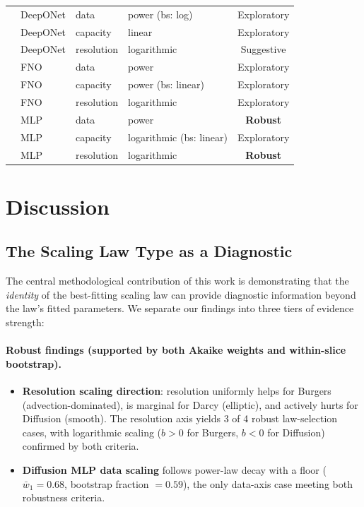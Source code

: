 \documentclass[11pt]{article}
\begin{document}
\begin{table}[h]
\begin{tabular}{@{}llllc@{}}
  & DeepONet & data       & power (bs: log) & Exploratory \\
  & DeepONet & capacity   & linear       & Exploratory \\
  & DeepONet & resolution & logarithmic & Suggestive \\
  & FNO      & data       & power       & Exploratory \\
  & FNO      & capacity   & power (bs: linear) & Exploratory \\
  & FNO      & resolution & logarithmic & Exploratory \\
  & MLP      & data       & power       & \textbf{Robust} \\
  & MLP      & capacity   & logarithmic (bs: linear) & Exploratory \\
  & MLP      & resolution & logarithmic & \textbf{Robust} \\
\bottomrule
\end{tabular}

\vspace{2pt}
\end{table}


\section{Discussion}
\label{sec:discussion}

\subsection{The Scaling Law Type as a Diagnostic}

The central methodological contribution of this work is demonstrating
that the \emph{identity} of the best-fitting scaling law can provide
diagnostic information beyond the law's fitted parameters.
We separate our findings into three tiers of evidence strength:

\paragraph{Robust findings (supported by both Akaike weights and
within-slice bootstrap).}
\begin{itemize}
  \item \textbf{Resolution scaling direction}: resolution uniformly
    helps for Burgers (advection-dominated), is marginal for Darcy
    (elliptic), and actively hurts for Diffusion (smooth).
    The resolution axis yields 3 of 4 robust law-selection cases,
    with logarithmic scaling ($b > 0$ for Burgers, $b < 0$ for
    Diffusion) confirmed by both criteria.
  \item \textbf{Diffusion MLP data scaling} follows power-law decay
    with a floor ($\bar{w}_1 = 0.68$, bootstrap fraction $= 0.59$),
    the only data-axis case meeting both robustness criteria.
\end{itemize}
\end{document}
